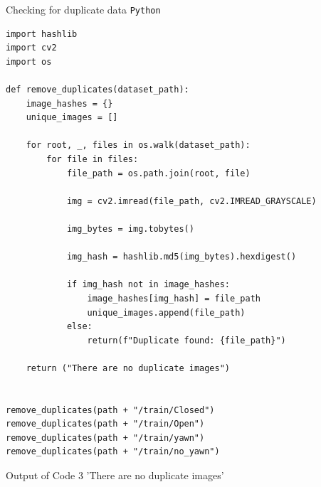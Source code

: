 \documentclass{modeleRapport}
\begin{document}
\begin{codebox}{Checking for duplicate data \texttt{Python}}
\begin{lstlisting}
import hashlib
import cv2
import os

def remove_duplicates(dataset_path):
    image_hashes = {}
    unique_images = []

    for root, _, files in os.walk(dataset_path):  
        for file in files:
            file_path = os.path.join(root, file)  

            img = cv2.imread(file_path, cv2.IMREAD_GRAYSCALE)

            img_bytes = img.tobytes()

            img_hash = hashlib.md5(img_bytes).hexdigest()

            if img_hash not in image_hashes:
                image_hashes[img_hash] = file_path
                unique_images.append(file_path)
            else:
                return(f"Duplicate found: {file_path}")

    return ("There are no duplicate images")


remove_duplicates(path + "/train/Closed")
remove_duplicates(path + "/train/Open")
remove_duplicates(path + "/train/yawn")
remove_duplicates(path + "/train/no_yawn")
\end{lstlisting}
\end{codebox}

\begin{codebox}[OutputB]{ Output of Code 3}
'There are no duplicate images'
\end{codebox}
\end{document}

